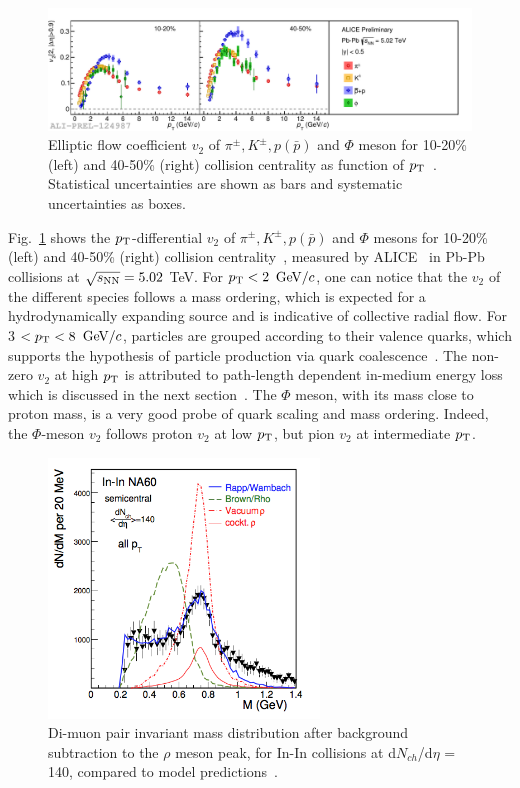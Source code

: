 \begin{figure}[!ht]
  \centering
  \includegraphics[width=15cm]{FigCap1/v2IdentifiedParticles.pdf}
  \caption{Elliptic flow coefficient $v_2$ of $\pi^{\pm}, K^{\pm}, p(\bar{p})$ and $\Phi$ meson for 10-20\% (left) and 40-50\% (right)
collision centrality as function of $p_{\rm T}$~\cite{Bertens:2017krr}. Statistical uncertainties are shown as bars and systematic uncertainties as boxes.}
  \label{fig:v2IdentifiedParticles}
\end{figure}
Fig.~\ref{fig:v2IdentifiedParticles} shows the $p_{\rm T}$-differential 
$v_2$ of $\pi^{\pm}, K^{\pm}, p(\bar{p})$ and $\Phi$ mesons for 10-20\% (left)
and 40-50\% (right) collision centrality~\cite{Bertens:2017krr}, measured by 
ALICE~\cite{Bertens:2017krr} in Pb-Pb collisions at $\sqrt{s_{\rm NN}} = 5.02$ TeV.
For $p_{\rm T} < 2$ $\mathrm{GeV}/c$, one can notice that the $v_2$ of the different species
 follows a mass ordering, which is expected for a hydrodynamically expanding 
 source and is indicative of collective radial flow.
For 3 $< p_{\rm T} < 8$ $\mathrm{GeV}/c$, particles are grouped according to their valence
 quarks, which supports the
hypothesis of particle production via quark coalescence~\cite{Molnar:2003ff}. 
The non-zero $v_2$ at high $p_{\rm T}$ is attributed to path-length dependent 
in-medium energy loss which is discussed in the next section~\cite{Gyulassy:2000gk}. The $\Phi$ meson, 
with its mass close to proton mass, is a very good probe of quark scaling and 
mass ordering. Indeed, the $\Phi$-meson $v_2$ follows proton $v_2$ at low 
$p_{\rm T}$, but pion $v_2$ at intermediate $p_{\rm T}$. \\

\label{sec:ChiralSymm}
\begin{figure}[!ht]
  \centering
  \includegraphics[width=7.2cm]{FigCap1/rhoMelting.png}
  \caption{Di-muon pair invariant mass distribution after 
background subtraction to the $\rho$ meson peak, for In-In collisions at d$N_{ch}$/d$\eta$ = 140, compared to model predictions~\cite{Rapp:2012zq}.}
  \label{fig:JPsiSuppressionNA50}
\end{figure}

